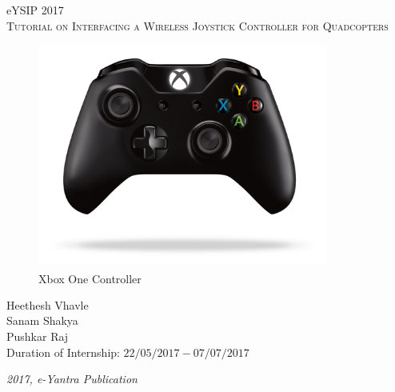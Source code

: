\documentclass[a4paper,12pt,oneside]{book}
\begin{document}
\begin{titlepage}
\raggedright
{\Large eYSIP 2017\\[1cm]}
{\Huge \scshape Tutorial on Interfacing a Wireless Joystick Controller for Quadcopters \\[.1in]}

\vfill

\begin{figure}[!htb]
\centering
\includegraphics[width=0.85\textwidth]{images/xbox_one}
\\Xbox\textsuperscript{\textregistered} One Controller\cite{xbox}
\end{figure}

\vfill

\begin{flushright}
{\large Heethesh Vhavle \\}
{\large Sanam Shakya \\}
{\large Pushkar Raj \\}
\vspace{0.5cm}
{\large Duration of Internship: $ 22/05/2017-07/07/2017 $ \\}
\end{flushright}
\medskip

{\itshape 2017, e-Yantra Publication}
\end{titlepage}



\end{document}

